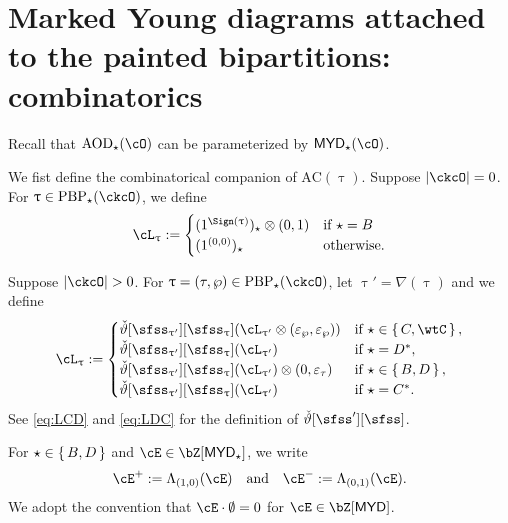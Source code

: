 \documentclass[12pt,a4paper]{amsart}
\newcommand{\AC}{\mathrm{AC}}
\def\abs#1{\left|{#1}\right|}
\def\MYD{{\mathsf{MYD}}}
\def\AND{\quad\text{and}\quad}
\def\AOD{\mathrm{AOD}}
\def\AC{\mathrm{AC}}
\def\ac{\cL}
\def\lotimes{\otimes}
\def\DD{\nabla}
\numberwithin{equation}{section}
\theoremstyle{remark}
\def\uptaup{\uptau^{\prime}}
\def\PBP{\mathrm{PBP}}
\begin{document}
\section{Marked Young diagrams attached to the painted bipartitions: combinatorics} \label{sec:ACC}

\def\acm{\cL}
\def\acme{\tilde{\cL}}

Recall that $\AOD_{\star}(\cO)$ can be parameterized by $\MYD_{\star}(\cO)$.


We fist define the combinatorical companion of $\AC(\uptau)$.
Suppose $\abs{\ckcO}=0$. For $\uptau\in \PBP_{\star}(\ckcO)$, we define
\[
  \ac_{\uptau} :=
  \begin{cases}
   (1^{\Sign(\uptau)})_{\star}\lotimes(0,1) & \text{if } \star=B\\
   (1^{(0,0)})_{\star} & \text{otherwise}.
  \end{cases}
\]

Suppose $\abs{\ckcO} >0$. For $\uptau = (\tau,\wp)\in \PBP_{\star}(\ckcO)$, let
$\uptau' = \DD(\uptau)$ and we define
\[
\ac_{\uptau} :=
\begin{cases}
  \dlift[\sfss_{\uptau'}][\sfss_{\uptau}](\ac_{\uptaup}\lotimes (\varepsilon_{\wp},\varepsilon_{\wp}))
  & \text{if } \star\in \set{C,\wtC},\\
  \dlift[\sfss_{\uptau'}][\sfss_{\uptau}](\ac_{\uptaup})
  & \text{if } \star = D^{*}, \\
  \dlift[\sfss_{\uptau'}][\sfss_{\uptau}](\ac_{\uptaup})\lotimes (0,\varepsilon_{\tau})
  & \text{if } \star \in \set{B,D}, \\
  \dlift[\sfss_{\uptau'}][\sfss_{\uptau}](\ac_{\uptaup})
  & \text{if } \star = C^{*}.
\end{cases}
\]
See  \eqref{eq:LCD} and \eqref{eq:LDC} for the definition of $\dlift[\sfss'][\sfss]$.

For $\star\in \set{B,D}$ and $\cE\in \bZ[\MYD_{\star}]$, we write
\[
\cE^{+} := \Lambda_{(1,0)}(\cE) \AND \cE^{-} := \Lambda_{(0,1)}(\cE).
\]
We adopt the convention that $\cE\cdot \emptyset = 0$ for $\cE\in\bZ[\MYD]$.
\end{document}
